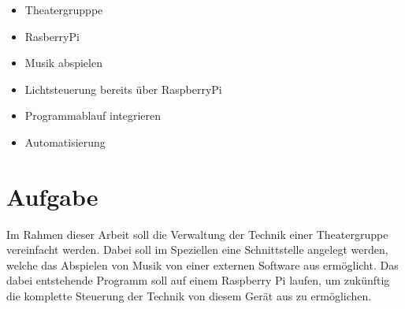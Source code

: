 \begin{itemize}
\item Theatergrupppe
\item RasberryPi
\item Musik abspielen
\item Lichtsteuerung bereits über RaspberryPi
\item Programmablauf integrieren
\item Automatisierung
\end{itemize}

\section{Aufgabe}
Im Rahmen dieser Arbeit soll die Verwaltung der Technik einer Theatergruppe
vereinfacht werden. Dabei soll im Speziellen eine Schnittstelle angelegt
werden, welche das Abspielen von Musik von einer externen Software aus
ermöglicht. Das dabei entstehende Programm soll auf einem Raspberry Pi laufen,
um zukünftig die komplette Steuerung der Technik von diesem Gerät aus zu
ermöglichen.

